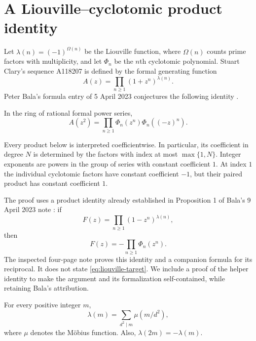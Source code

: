 \section{A Liouville--cyclotomic product identity}\label{sec:liouville}

Let $\lambda(n)=(-1)^{\Omega(n)}$ be the Liouville function, where
$\Omega(n)$ counts prime factors with multiplicity, and let $\Phi_n$ be
the $n$th cyclotomic polynomial. Stuart Clary's sequence A118207 is defined by
the formal generating function
\begin{equation}\label{eq:liouville-A}
 A(z)=\prod_{n\ge1}(1+z^n)^{\lambda(n)}.
\end{equation}
Peter Bala's formula entry of 5 April 2023 conjectures the following
identity \cite{oeis118207}.

\begin{theorem}\label{thm:liouville-main}
In the ring of rational formal power series,
\begin{equation}\label{eq:liouville-target}
 A(z^2)=\prod_{n\ge1}\Phi_n(z^n)\Phi_n((-z)^n).
\end{equation}
\end{theorem}

Every product below is interpreted coefficientwise. In particular, its
coefficient in degree $N$ is determined by the factors with index at most
$\max\{1,N\}$. Integer exponents are powers in the group of series with constant
coefficient $1$. At index $1$ the individual cyclotomic factors have
constant coefficient $-1$, but their paired product has constant
coefficient $1$.

The proof uses a product identity already established in Proposition 1 of
Bala's 9 April 2023 note \cite{bala2023}: if
\[
 F(z)=\prod_{n\ge1}(1-z^n)^{\lambda(n)},
\]
then
\begin{equation}\label{eq:bala-known}
 F(z)=-\prod_{n\ge1}\Phi_n(z^n).
\end{equation}
The inspected four-page note proves this identity and a companion
formula for its reciprocal. It does not state
\eqref{eq:liouville-target}. We include a proof of the helper identity to
make the argument and its formalization self-contained, while retaining
Bala's attribution.

\begin{lemma}\label{lem:liouville-square}
For every positive integer $m$,
\begin{equation}\label{eq:liouville-square}
 \lambda(m)=\sum_{d^2\mid m}\mu(m/d^2),
\end{equation}
where $\mu$ denotes the M\"obius function. Also,
$\lambda(2m)=-\lambda(m)$.
\end{lemma}

